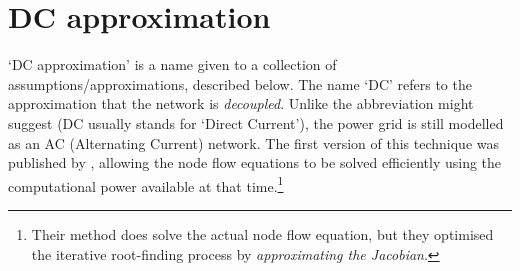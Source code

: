 \documentclass[main.tex]{subfiles}
\begin{document}
\section{DC approximation}\label{DCapproximation}
`DC approximation' is a name given to a collection of assumptions/approximations, described below. The name `DC' refers to the approximation that the network is \emph{decoupled}. Unlike the abbreviation might suggest (DC usually stands for `Direct Current'), the power grid is still modelled as an AC (Alternating Current) network. The first version of this technique was published by \cite{Scott1974}, allowing the node flow equations to be solved efficiently using the computational power available at that time.\footnote{Their method does solve the actual node flow equation, but they optimised the iterative root-finding process by \emph{approximating the Jacobian}.}
\end{document}
